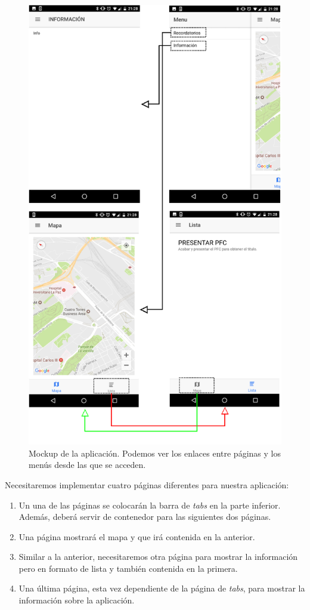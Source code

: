 \begin{figure}[H]
\centering
    \centering
        \includegraphics[height=0.7\textheight]{Figures/ch2/ReminderMap/mockup}
    \caption{Mockup de la aplicación. Podemos ver los enlaces entre páginas y los menús desde las que se acceden.}
\end{figure}

Necesitaremos implementar cuatro páginas diferentes para nuestra aplicación:

\begin{enumerate}
  \item Un una de las páginas se colocarán la barra de \emph{tabs} en la parte inferior. Además, deberá servir de contenedor para las siguientes dos páginas.
  \item Una página mostrará el mapa y que irá contenida en la anterior.
  \item Similar a la anterior, necesitaremos otra página para mostrar la información pero en formato de lista y también contenida en la primera.
  \item Una última página, esta vez dependiente de la página de \emph{tabs}, para mostrar la información sobre la aplicación.
\end{enumerate}

